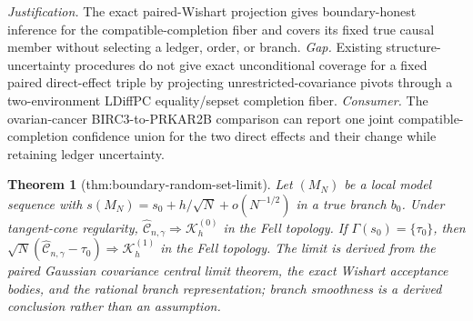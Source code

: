 \documentclass{article}
\newtheorem{theorem}{Theorem}
\begin{document}
\par\smallskip\noindent \textit{Justification.} The exact paired-Wishart projection gives boundary-honest inference for the compatible-completion fiber and covers its fixed true causal member without selecting a ledger, order, or branch. \textit{Gap.} Existing structure-uncertainty procedures do not give exact unconditional coverage for a fixed paired direct-effect triple by projecting unrestricted-covariance pivots through a two-environment LDiffPC equality/sepset completion fiber. \textit{Consumer.} The ovarian-cancer BIRC3-to-PRKAR2B comparison can report one joint compatible-completion confidence union for the two direct effects and their change while retaining ledger uncertainty.

\begin{theorem}[thm:boundary-random-set-limit]\label{thm:boundary-random-set-limit}
Let \((M_N)\) be a local model sequence with \(s(M_N)=s_0+h/\sqrt N+o(N^{-1/2})\) in a true branch \(b_0\). Under tangent-cone regularity, \(\widehat{\mathcal C}_{n,\gamma}\Rightarrow\mathcal K_h^{(0)}\) in the Fell topology. If \(\Gamma(s_0)=\{\tau_0\}\), then \(\sqrt N(\widehat{\mathcal C}_{n,\gamma}-\tau_0)\Rightarrow\mathcal K_h^{(1)}\) in the Fell topology. The limit is derived from the paired Gaussian covariance central limit theorem, the exact Wishart acceptance bodies, and the rational branch representation; branch smoothness is a derived conclusion rather than an assumption.
\end{theorem}
\end{document}
